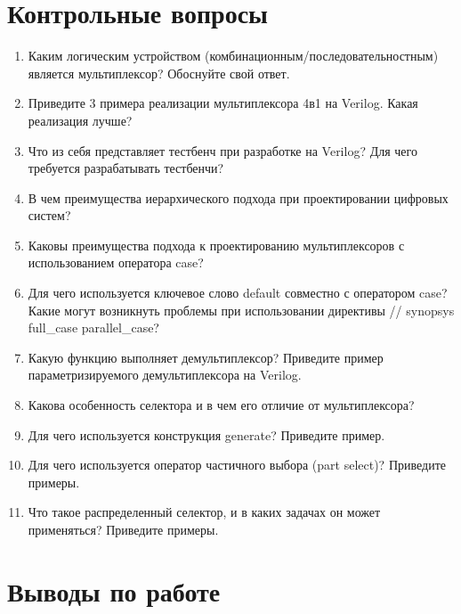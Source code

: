 \documentclass[a4paper,14pt]{article}
\begin{document}
\section{Контрольные вопросы}

\begin{enumerate}
	\item Каким логическим устройством (комбинационным/последовательностным) является	мультиплексор? Обоснуйте свой ответ.
	
	\item Приведите 3 примера реализации мультиплексора 4в1 на Verilog. Какая реализация лучше?

	\item Что из себя представляет тестбенч при разработке на Verilog? Для чего требуется	разрабатывать тестбенчи?
	
	\item В чем преимущества иерархического подхода при проектировании цифровых систем?
	
	\item Каковы преимущества подхода к проектированию мультиплексоров с использованием оператора case?
	
	\item Для чего используется ключевое слово default совместно с оператором case? Какие могут возникнуть проблемы при использовании директивы // synopsys full\_case parallel\_case?
	
	\item Какую функцию выполняет демультиплексор? Приведите пример параметризируемого демультиплексора на Verilog.
	
	\item Какова особенность селектора и в чем его отличие от мультиплексора?
	
	\item Для чего используется конструкция generate? Приведите пример.
	
	\item Для чего используется оператор частичного выбора (part select)? Приведите примеры.
	
	\item Что такое распределенный селектор, и в каких задачах он может применяться? Приведите примеры.
\end{enumerate}

\section{Выводы по работе}
\end{document}
